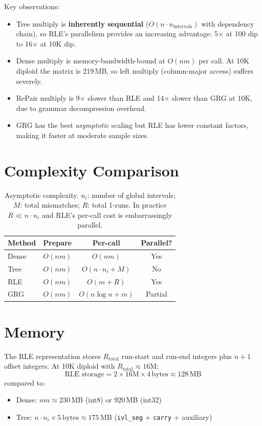 \documentclass[11pt]{article}
\begin{document}
Key observations:
\begin{itemize}
\item Tree multiply is \textbf{inherently sequential} ($O(n \cdot
n_\text{intervals})$ with dependency chain), so RLE's parallelism provides
an increasing advantage: 5$\times$ at 100 dip to 16$\times$ at 10K dip.
\item Dense multiply is memory-bandwidth-bound at $O(nm)$ per call.  At
10K diploid the matrix is 219\,MB, so left multiply (column-major access)
suffers severely.
\item RePair multiply is 9$\times$ slower than RLE and 14$\times$ slower
than GRG at 10K, due to grammar decompression overhead.
\item GRG has the best \emph{asymptotic} scaling but RLE has lower constant
factors, making it faster at moderate sample sizes.
\end{itemize}

\section{Complexity Comparison}

\begin{table}[h]
\centering
\begin{tabular}{l c c c}
\toprule
Method & Prepare & Per-call & Parallel? \\
\midrule
Dense        & $O(nm)$ & $O(nm)$ & Yes \\
Tree         & $O(nm)$ & $O(n \cdot n_i + M)$ & No \\
RLE          & $O(nm)$ & $O(m + R)$ & Yes \\
GRG          & $O(nm)$ & $O(n \log n + m)$ & Partial \\
\bottomrule
\end{tabular}
\caption{Asymptotic complexity.  $n_i$: number of global intervals;
$M$: total mismatches; $R$: total 1-runs.  In practice $R \ll n \cdot
n_i$ and RLE's per-call cost is embarrassingly parallel.}
\label{tab:complexity}
\end{table}

\section{Memory}

The RLE representation stores $R_\text{total}$ run-start and run-end
integers plus $n{+}1$ offset integers.  At 10K diploid with $R_\text{total}
\approx 16$M:
\[
\text{RLE storage} = 2 \times 16\text{M} \times 4\,\text{bytes} \approx 128\,\text{MB}
\]
compared to:
\begin{itemize}
\item Dense: $nm \approx 230$\,MB (int8) or $920$\,MB (int32)
\item Tree: $n \cdot n_i \times 5\,\text{bytes} \approx 175$\,MB
(\texttt{ivl\_seg} + \texttt{carry} + auxiliary)
\end{itemize}
\end{document}
